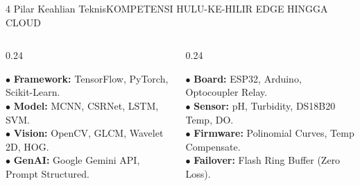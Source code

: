 \documentclass[aspectratio=169,11pt]{beamer}
\begin{document}
\begin{frame}{4 Pilar Keahlian Teknis}{KOMPETENSI HULU-KE-HILIR EDGE HINGGA CLOUD}
  \begin{columns}[t]
    \begin{column}{0.24\textwidth}
      \begin{tcolorbox}[colback=brandCardBg,colframe=brandBorder,arc=2mm,boxrule=0.6pt,boxsep=2pt,top=3pt,bottom=3pt,title={\scriptsize \bfseries \color{brandNavy} 1. AI \& Vision}]
        {\tiny \color{brandDark}
        $\bullet$ \textbf{Framework:} TensorFlow, PyTorch, Scikit-Learn. \\ \vspace{2pt}
        $\bullet$ \textbf{Model:} MCNN, CSRNet, LSTM, SVM. \\ \vspace{2pt}
        $\bullet$ \textbf{Vision:} OpenCV, GLCM, Wavelet 2D, HOG. \\ \vspace{2pt}
        $\bullet$ \textbf{GenAI:} Google Gemini API, Prompt Structured.
        }
      \end{tcolorbox}
    \end{column}

    \begin{column}{0.24\textwidth}
      \begin{tcolorbox}[colback=brandCardBg,colframe=brandBorder,arc=2mm,boxrule=0.6pt,boxsep=2pt,top=3pt,bottom=3pt,title={\scriptsize \bfseries \color{brandNavy} 2. IoT Telemetri}]
        {\tiny \color{brandDark}
        $\bullet$ \textbf{Board:} ESP32, Arduino, Optocoupler Relay. \\ \vspace{2pt}
        $\bullet$ \textbf{Sensor:} pH, Turbidity, DS18B20 Temp, DO. \\ \vspace{2pt}
        $\bullet$ \textbf{Firmware:} Polinomial Curves, Temp Compensate. \\ \vspace{2pt}
        $\bullet$ \textbf{Failover:} Flash Ring Buffer (Zero Loss).
        }
      \end{tcolorbox}
    \end{column}


\end{columns}
\end{frame}
\end{document}
